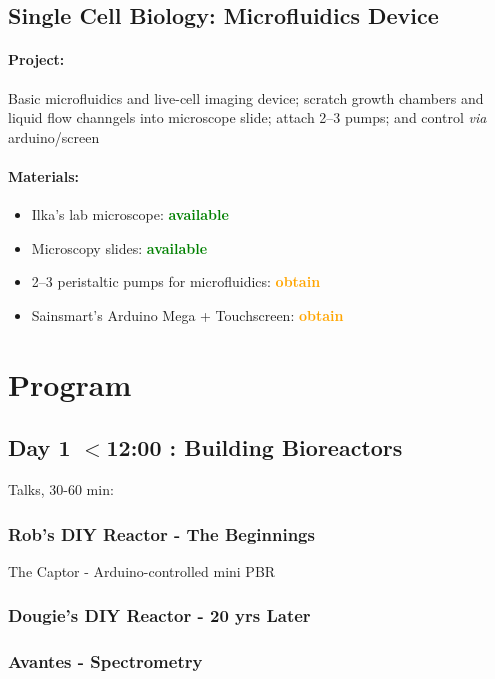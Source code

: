 \documentclass[12pt,a4paper]{scrartcl}
\newcommand{\obtain}[0]{\textcolor{orange}{\textbf{obtain}}}
\newcommand{\avail}[0]{\textcolor{green}{\textbf{available}}}
\begin{document}
\subsection{Single Cell Biology: Microfluidics Device} 
\label{micro}

\paragraph{Project:} Basic microfluidics and live-cell imaging device;
scratch growth chambers and liquid flow channgels into microscope slide;
attach 2--3 pumps; and control \textit{via} arduino/screen

\paragraph{Materials:}
\begin{itemize}
\item Ilka's lab microscope: \avail{}
\item Microscopy slides: \avail{}
\item 2--3 peristaltic pumps for microfluidics: \obtain{}
\item Sainsmart's Arduino Mega + Touchscreen: \obtain{}
\end{itemize}


\newpage

\section{Program}

\subsection{Day 1 $<$12:00 : Building Bioreactors}

Talks, 30-60 min:

\subsubsection{Rob's DIY Reactor - The Beginnings}

The Captor - Arduino-controlled mini PBR

\subsubsection{Dougie's DIY Reactor - 20 yrs Later}
\subsubsection{Avantes - Spectrometry}
\end{document}
